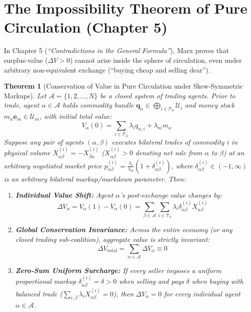 \documentclass[11pt,a4paper]{article}
\newtheorem{theorem}{Theorem}[section]
\begin{document}
\section{The Impossibility Theorem of Pure Circulation (Chapter 5)}

In Chapter 5 (\textit{``Contradictions in the General Formula''}), Marx proves that surplus-value ($\Delta V > 0$) cannot arise inside the sphere of circulation, even under arbitrary non-equivalent exchange (``buying cheap and selling dear'').

\begin{theorem}[Conservation of Value in Pure Circulation under Skew-Symmetric Markups]
Let $\mathcal{A} = \{1, 2, \dots, N\}$ be a closed system of trading agents. Prior to trade, agent $\alpha \in \mathcal{A}$ holds commodity bundle $\mathbf{q}_\alpha \in \bigoplus_{i \in \mathcal{T}_0} \mathcal{U}_i$ and money stock $m_\alpha \mathbf{e}_m \in \mathcal{U}_m$, with initial total value:
\begin{equation}
    V_\alpha(0) = \sum_{i \in \mathcal{T}_0} \lambda_i q_{\alpha, i} + \lambda_m m_\alpha
\end{equation}
Suppose any pair of agents $(\alpha, \beta)$ executes bilateral trades of commodity $i$ in physical volume $X_{\alpha \beta}^{(i)} = -X_{\beta \alpha}^{(i)}$ ($X_{\alpha \beta}^{(i)} > 0$ denoting net sale from $\alpha$ to $\beta$) at an arbitrary negotiated market price $p_{\alpha \beta}^{(i)} = \frac{\lambda_i}{\lambda_m}(1 + \delta_{\alpha \beta}^{(i)})$, where $\delta_{\alpha \beta}^{(i)} \in (-1, \infty)$ is an arbitrary bilateral markup/markdown parameter. Then:
\begin{enumerate}[label=(\arabic*)]
    \item \textbf{Individual Value Shift:} Agent $\alpha$'s post-exchange value changes by:
    \begin{equation}
        \Delta V_\alpha = V_\alpha(1) - V_\alpha(0) = \sum_{\beta \in \mathcal{A}} \sum_{i \in \mathcal{T}_0} \lambda_i \delta_{\alpha \beta}^{(i)} X_{\alpha \beta}^{(i)}
    \end{equation}
    \item \textbf{Global Conservation Invariance:} Across the entire economy (or any closed trading sub-coalition), aggregate value is strictly invariant:
    \begin{equation}
        \Delta V_{\text{total}} = \sum_{\alpha \in \mathcal{A}} \Delta V_\alpha \equiv 0
    \end{equation}
    \item \textbf{Zero-Sum Uniform Surcharge:} If every seller imposes a uniform proportional markup $\delta_{\alpha \beta}^{(i)} = \delta > 0$ when selling and pays $\delta$ when buying with balanced trade ($\sum_{i, \beta} \lambda_i X_{\alpha \beta}^{(i)} = 0$), then $\Delta V_\alpha = 0$ for every individual agent $\alpha \in \mathcal{A}$.
\end{enumerate}
\end{theorem}
\end{document}
